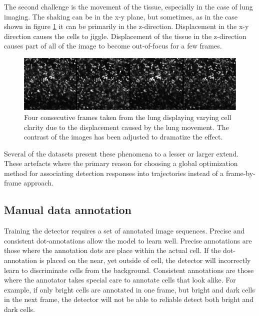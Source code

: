 	The second challenge is the movement of the tissue, especially in the case of lung imaging. The shaking can be in the x-y plane, but sometimes, as in the case shown in figure \cref{fig:data_challenges_movement} it can be primarily in the z-direction. Displacement in the x-y direction causes the cells to jiggle. Displacement of the tissue in the z-direction causes part of all of the image to become out-of-focus for a few frames.
	
	\begin{figure}[h]

		\includegraphics[width=\textwidth]{images/data_challenge_movement}

		\caption{Four consecutive frames taken from the lung displaying varying cell clarity due to the displacement caused by the lung movement. The contrast of the images has been adjusted to dramatize the effect.}
		\label{fig:data_challenges_movement}
	\end{figure}
	
	Several of the datasets present these phenomena to a lesser or larger extend. These artefacts where the primary reason for choosing a global optimization method for associating detection responses into trajectories instead of a frame-by-frame approach.
	
	\subsection{Manual data annotation \statusnew}
	
	Training the detector requires a set of annotated image sequences. Precise and consistent dot-annotations allow the model to learn well. Precise annotations are those where the annotation dots are place within the actual cell. If the dot-annotation is placed on the near, yet outside of cell, the detector will incorrectly learn to discriminate cells from the background. Consistent annotations are those where the annotator takes special care to annotate cells that look alike. For example, if only bright cells are annotated in one frame, but bright and dark cells in the next frame, the detector will not be able to reliable detect both bright and dark cells.
	
